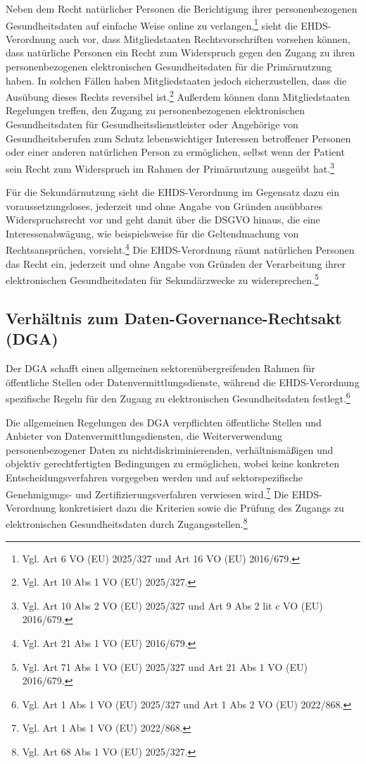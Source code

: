 Neben dem Recht natürlicher Personen die Berichtigung ihrer personenbezogenen Gesundheitsdaten auf einfache Weise online zu verlangen,\footnote{Vgl. Art 6 VO (EU) 2025/327 und Art 16 VO (EU) 2016/679.} sieht die EHDS-Verordnung auch vor, dass Mitgliedstaaten Rechtsvorschriften vorsehen können, dass natürliche Personen ein Recht zum Widerspruch gegen den Zugang zu ihren personenbezogenen elektronischen Gesundheitsdaten für die Primärnutzung haben. In solchen Fällen haben Mitgliedstaaten jedoch sicherzustellen, dass die Ausübung dieses Rechts reversibel ist.\footnote{Vgl. Art 10 Abs 1 VO (EU) 2025/327.} Außerdem können dann Mitgliedstaaten Regelungen treffen, den Zugang zu personenbezogenen elektronischen Gesundheitsdaten für Gesundheitsdienstleister oder Angehörige von Gesundheitsberufen zum Schutz lebenswichtiger Interessen betroffener Personen oder einer anderen natürlichen Person zu ermöglichen, selbst wenn der Patient sein Recht zum Widerspruch im Rahmen der Primärnutzung ausgeübt hat.\footnote{Vgl. Art 10 Abs 2 VO (EU) 2025/327 und Art 9 Abs 2 lit c VO (EU) 2016/679.}

Für die Sekundärnutzung sieht die EHDS-Verordnung im Gegensatz dazu ein voraussetzungsloses, jederzeit und ohne Angabe von Gründen ausübbares Widerspruchsrecht vor und geht damit über die DSGVO hinaus, die eine Interessenabwägung, wie beispielsweise für die Geltendmachung  von Rechtsansprüchen, vorsieht.\footnote{Vgl. Art 21 Abs 1 VO (EU) 2016/679.} Die EHDS-Verordnung räumt natürlichen Personen das Recht ein, jederzeit und ohne Angabe von Gründen der Verarbeitung ihrer elektronischen Gesundheitsdaten für Sekundärzwecke zu widersprechen.\footnote{Vgl. Art 71 Abs 1 VO (EU) 2025/327 und Art 21 Abs 1 VO (EU) 2016/679.}

        \subsection{Verhältnis zum Daten-Governance-Rechtsakt (DGA)}
Der DGA schafft einen allgemeinen sektorenübergreifenden Rahmen für öffentliche Stellen oder Datenvermittlungsdienste, während die EHDS-Verordnung spezifische Regeln für den Zugang zu elektronischen Gesundheitsdaten festlegt.\footnote{Vgl. Art 1 Abs 1 VO (EU) 2025/327 und Art 1 Abs 2 VO (EU) 2022/868.}

Die allgemeinen Regelungen des DGA verpflichten öffentliche Stellen und Anbieter von Datenvermittlungsdiensten, die Weiterverwendung personenbezogener Daten zu nichtdiskriminierenden, verhältnismäßigen und objektiv gerechtfertigten Bedingungen zu ermöglichen, wobei keine konkreten Entscheidungsverfahren vorgegeben werden und auf sektorspezifische Genehmigungs- und Zertifizierungsverfahren verwiesen wird.\footnote{Vgl. Art 1 Abs 1 VO (EU) 2022/868.} Die EHDS-Verordnung konkretisiert dazu die Kriterien sowie die Prüfung des Zugangs zu elektronischen Gesundheitsdaten durch Zugangsstellen.\footnote{Vgl. Art 68 Abs 1 VO (EU) 2025/327.}

